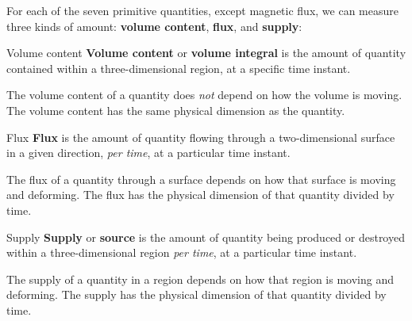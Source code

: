 \documentclass[a4paper,12pt,%
onecolumn,oneside,%
british%
]{memoir}
\renewcommand*{\|}[1][]{\nonscript\:#1\vert\nonscript\:\mathopen{}}
\begin{document}
\medskip

For each of the seven primitive quantities, except magnetic flux, we can measure three kinds of amount: \textbf{volume content}, \textbf{flux}, and \textbf{supply}:

%
%
\begin{definition}{Volume content}
  \textbf{Volume content} or \textbf{volume integral} is the amount of quantity contained within a three-dimensional region, at a specific time instant.

  \smallskip

  The volume content of a quantity does \emph{not} depend on how the volume is moving. The volume content has the same physical dimension as the quantity.
\end{definition}

%
%
\begin{definition}{Flux}
  \textbf{Flux} is the amount of quantity flowing through a two-dimensional surface in a given direction, \emph{per time}, at a particular time instant.

  \smallskip

  The flux of a quantity through a surface depends on how that surface is moving and deforming. The flux has the physical dimension of that quantity divided by time.
\end{definition}


\begin{definition}{Supply}
  \textbf{Supply} or \textbf{source} is the amount of quantity being produced or destroyed within a three-dimensional region \emph{per time}, at a particular time instant.

  \smallskip

  The supply of a quantity in a region depends on how that region is moving and deforming. The supply has the physical dimension of that quantity divided by time.
\end{definition}
\end{document}
